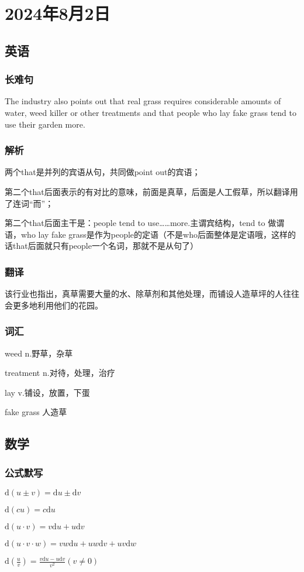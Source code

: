 \documentclass[UTF8]{ctexart}
\begin{document}
\section{2024年8月2日}
\subsection{英语}
\subsubsection{长难句}
The industry also points out that real grass requires considerable amounts of water, weed killer or other treatments and that people who lay fake grass tend to use their garden more.
\subsubsection{解析}
两个that是并列的宾语从句，共同做point out的宾语；

第二个that后面表示的有对比的意味，前面是真草，后面是人工假草，所以翻译用了连词“而”；

第二个that后面主干是：people tend to use……more.主谓宾结构，tend to 做谓语，who lay fake grass是作为people的定语（不是who后面整体是定语哦，这样的话that后面就只有people一个名词，那就不是从句了）
\subsubsection{翻译}
该行业也指出，真草需要大量的水、除草剂和其他处理，而铺设人造草坪的人往往会更多地利用他们的花园。
\subsubsection{词汇}
\begin{multicols}{2}
      weed n.野草，杂草

      treatment  n.对待，处理，治疗

      lay  v.铺设，放置，下蛋

      fake grass 人造草
\end{multicols}
\subsection{数学}
\subsubsection{公式默写}
\begin{multicols}{2}
      $\mathrm{d}(u\pm v) =\mathrm{d}u\pm \mathrm{d}v$

      $\mathrm{d}(cu)=c\mathrm{d}u$

      $\mathrm{d}(u\cdot v)=v\mathrm{d}u+u\mathrm{d}v$

      $\mathrm{d}(u\cdot v\cdot w)=vw\mathrm{d}u+uw\mathrm{d}v+uv\mathrm{d}w$

      $\mathrm{d}(\frac{u}{v})=\frac{v\mathrm{d}u-u\mathrm{d}v}{v^2}(v\ne 0)$
\end{multicols}
\end{document}
